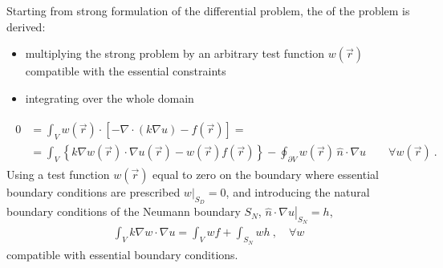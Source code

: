 \documentclass[letterpaper,10pt,english]{jupyterBook}
\begin{document}
\sphinxAtStartPar
Starting from strong formulation of the differential problem, the  of the problem is derived:
\begin{itemize}
\item {} 
\sphinxAtStartPar
multiplying the strong problem by an arbitrary test function \(w(\vec{r})\) compatible with the essential constraints

\item {} 
\sphinxAtStartPar
integrating over the whole domain

\end{itemize}
\begin{equation*}
\begin{split}\begin{aligned}
  0
  & = \int_{V} w(\vec{r}) \cdot \left[ - \nabla \cdot \left( k \nabla u \right) - f(\vec{r}) \right] = \\
  & = \int_{V} \left\{  k \nabla w(\vec{r}) \cdot  \nabla u(\vec{r}) - w(\vec{r}) f(\vec{r}) \right\} - \oint_{\partial V} w(\vec{r}) \, \hat{n} \cdot \nabla u \qquad \forall w(\vec{r}) \ .
\end{aligned}\end{split}
\end{equation*}
\sphinxAtStartPar
Using a test function \(w(\vec{r})\) equal to zero on the boundary where essential boundary conditions are prescribed \(\left.w\right|_{S_D} = 0\), and introducing the natural boundary conditions of the Neumann boundary \(S_N\), \(\left. \hat{n} \cdot \nabla u\right|_{S_N} = h\),
\begin{equation*}
\begin{split}\int_{V} k \nabla w \cdot \nabla u = \int_V w f + \int_{S_N} w h \ , \quad \forall w\end{split}
\end{equation*}
\sphinxAtStartPar
compatible with essential boundary conditions.
\label{ch/pde/numerics:pde:ex:fem}
\end{document}
